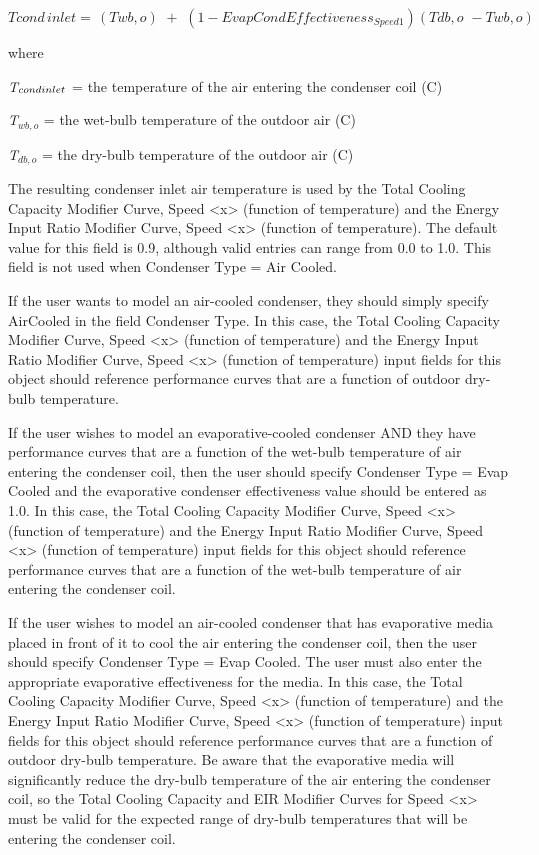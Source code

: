 \begin{equation}
Tcond\,inlet = \,\left( {Twb,o} \right)\,\, + \,\,\left( {1 - EvapCondEffectivenes{s_{Speed1}}} \right)\left( {Tdb,o\,\, - Twb,o} \right)
\end{equation}

where

\emph{T\(_{cond\\ inlet}\)} = the temperature of the air entering the condenser coil (C)

\emph{T\(_{wb,o}\)} = the wet-bulb temperature of the outdoor air (C)

\emph{T\(_{db,o}\)} = the dry-bulb temperature of the outdoor air (C)

The resulting condenser inlet air temperature is used by the Total Cooling Capacity Modifier Curve, Speed \textless{}x\textgreater{} (function of temperature) and the Energy Input Ratio Modifier Curve, Speed \textless{}x\textgreater{} (function of temperature). The default value for this field is 0.9, although valid entries can range from 0.0 to 1.0. This field is not used when Condenser Type = Air Cooled.

If the user wants to model an air-cooled condenser, they should simply specify AirCooled in the field Condenser Type. In this case, the Total Cooling Capacity Modifier Curve, Speed \textless{}x\textgreater{} (function of temperature) and the Energy Input Ratio Modifier Curve, Speed \textless{}x\textgreater{} (function of temperature) input fields for this object should reference performance curves that are a function of outdoor dry-bulb temperature.

If the user wishes to model an evaporative-cooled condenser AND they have performance curves that are a function of the wet-bulb temperature of air entering the condenser coil, then the user should specify Condenser Type = Evap Cooled and the evaporative condenser effectiveness value should be entered as 1.0. In this case, the Total Cooling Capacity Modifier Curve, Speed \textless{}x\textgreater{} (function of temperature) and the Energy Input Ratio Modifier Curve, Speed \textless{}x\textgreater{} (function of temperature) input fields for this object should reference performance curves that are a function of the wet-bulb temperature of air entering the condenser coil.

If the user wishes to model an air-cooled condenser that has evaporative media placed in front of it to cool the air entering the condenser coil, then the user should specify Condenser Type = Evap Cooled. The user must also enter the appropriate evaporative effectiveness for the media. In this case, the Total Cooling Capacity Modifier Curve, Speed \textless{}x\textgreater{} (function of temperature) and the Energy Input Ratio Modifier Curve, Speed \textless{}x\textgreater{} (function of temperature) input fields for this object should reference performance curves that are a function of outdoor dry-bulb temperature. Be aware that the evaporative media will significantly reduce the dry-bulb temperature of the air entering the condenser coil, so the Total Cooling Capacity and EIR Modifier Curves for Speed \textless{}x\textgreater{} must be valid for the expected range of dry-bulb temperatures that will be entering the condenser coil.

